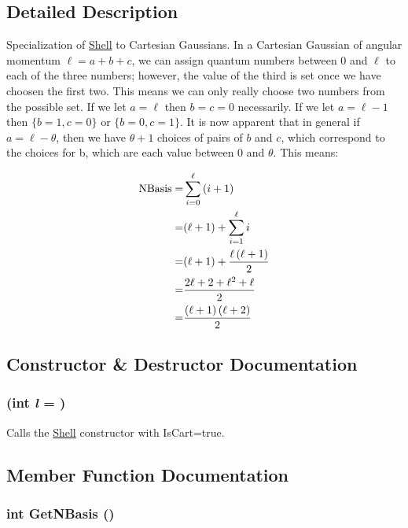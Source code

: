 \subsection{Detailed Description}
Specialization of \hyperlink{classJKBuilder_1_1Shell}{Shell} to Cartesian Gaussians. In a Cartesian Gaussian of angular momentum $\ell=a+b+c$, we can assign quantum numbers between 0 and $\ell$ to each of the three numbers; however, the value of the third is set once we have choosen the first two. This means we can only really choose two numbers from the possible set. If we let $a=\ell$ then $b=c=0$ necessarily. If we let $a=\ell-1$ then $\lbrace b=1,c=0\rbrace$ or $\lbrace b=0,c=1\rbrace$. It is now apparent that in general if $a=\ell-\theta$, then we have $\theta+1$ choices of pairs of $b$ and $c$, which correspond to the choices for b, which are each value between 0 and $\theta$. This means:

\begin{eqnarray*} \rm{NBasis}=&\sum_{i=0}^\ell\left(i+1\right)\\ =&(\ell+1)+\sum_{i=1}^\ell i\\ =&(\ell+1)+\frac{\ell\left(\ell+1\right)}{2}\\ =&\frac{2\ell+2+\ell^2+\ell}{2}\\ =&\frac{\left(\ell +1\right)\left(\ell +2\right)}{2} \end{eqnarray*} 

\subsection{Constructor \& Destructor Documentation}
\hypertarget{classJKBuilder_1_1CartShell_a57fcc9d47cb98edd56f6e2122f15afd6}{
\subsubsection[{CartShell}]{ (int {\em l} = {})}}
\label{classJKBuilder_1_1CartShell_a57fcc9d47cb98edd56f6e2122f15afd6}


Calls the \hyperlink{classJKBuilder_1_1Shell}{Shell} constructor with IsCart=true. 

\subsection{Member Function Documentation}
\hypertarget{classJKBuilder_1_1CartShell_a297c144fb990284ac5973c99cdd55f91}{
\subsubsection[{GetNBasis}]{\setlength{\rightskip}{0pt plus 5cm}int GetNBasis ()}}
\label{classJKBuilder_1_1CartShell_a297c144fb990284ac5973c99cdd55f91}


